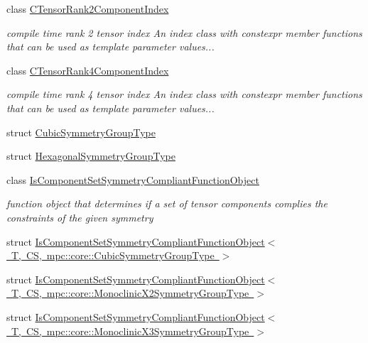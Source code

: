 \begin{DoxyCompactItemize}
class \mbox{\hyperlink{classmpc_1_1core_1_1_c_tensor_rank2_component_index}{C\+Tensor\+Rank2\+Component\+Index}}
\begin{DoxyCompactList}\small\item\em compile time rank 2 tensor index An index class with constexpr member functions that can be used as template parameter values... \end{DoxyCompactList}\item 
class \mbox{\hyperlink{classmpc_1_1core_1_1_c_tensor_rank4_component_index}{C\+Tensor\+Rank4\+Component\+Index}}
\begin{DoxyCompactList}\small\item\em compile time rank 4 tensor index An index class with constexpr member functions that can be used as template parameter values... \end{DoxyCompactList}\item 
struct \mbox{\hyperlink{structmpc_1_1core_1_1_cubic_symmetry_group_type}{Cubic\+Symmetry\+Group\+Type}}
\item 
struct \mbox{\hyperlink{structmpc_1_1core_1_1_hexagonal_symmetry_group_type}{Hexagonal\+Symmetry\+Group\+Type}}
\item 
class \mbox{\hyperlink{structmpc_1_1core_1_1_is_component_set_symmetry_compliant_function_object}{Is\+Component\+Set\+Symmetry\+Compliant\+Function\+Object}}
\begin{DoxyCompactList}\small\item\em function object that determines if a set of tensor components complies the constraints of the given symmetry \end{DoxyCompactList}\item 
struct \mbox{\hyperlink{structmpc_1_1core_1_1_is_component_set_symmetry_compliant_function_object_3_01_t_00_01_c_s_00_01723db7c1bc35eb364238a108ed0b27cf}{Is\+Component\+Set\+Symmetry\+Compliant\+Function\+Object$<$ T, C\+S, mpc\+::core\+::\+Cubic\+Symmetry\+Group\+Type $>$}}
\item 
struct \mbox{\hyperlink{structmpc_1_1core_1_1_is_component_set_symmetry_compliant_function_object_3_01_t_00_01_c_s_00_016f569c2dcdd1cc1caa682f778656be28}{Is\+Component\+Set\+Symmetry\+Compliant\+Function\+Object$<$ T, C\+S, mpc\+::core\+::\+Monoclinic\+X2\+Symmetry\+Group\+Type $>$}}
\item 
struct \mbox{\hyperlink{structmpc_1_1core_1_1_is_component_set_symmetry_compliant_function_object_3_01_t_00_01_c_s_00_013f9861239b5d9799e3a43792ff074444}{Is\+Component\+Set\+Symmetry\+Compliant\+Function\+Object$<$ T, C\+S, mpc\+::core\+::\+Monoclinic\+X3\+Symmetry\+Group\+Type $>$}}

\end{DoxyCompactItemize}
